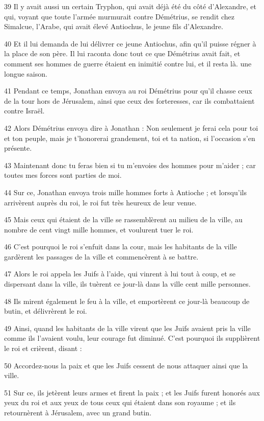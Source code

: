 \par 39 Il y avait aussi un certain Tryphon, qui avait déjà été du côté d'Alexandre, et qui, voyant que toute l'armée murmurait contre Démétrius, se rendit chez Simalcue, l'Arabe, qui avait élevé Antiochus, le jeune fils d'Alexandre.
\par 40 Et il lui demanda de lui délivrer ce jeune Antiochus, afin qu'il puisse régner à la place de son père. Il lui raconta donc tout ce que Démétrius avait fait, et comment ses hommes de guerre étaient en inimitié contre lui, et il resta là. une longue saison.
\par 41 Pendant ce temps, Jonathan envoya au roi Démétrius pour qu'il chasse ceux de la tour hors de Jérusalem, ainsi que ceux des forteresses, car ils combattaient contre Israël.
\par 42 Alors Démétrius envoya dire à Jonathan : Non seulement je ferai cela pour toi et ton peuple, mais je t'honorerai grandement, toi et ta nation, si l'occasion s'en présente.
\par 43 Maintenant donc tu feras bien si tu m'envoies des hommes pour m'aider ; car toutes mes forces sont parties de moi.
\par 44 Sur ce, Jonathan envoya trois mille hommes forts à Antioche ; et lorsqu'ils arrivèrent auprès du roi, le roi fut très heureux de leur venue.
\par 45 Mais ceux qui étaient de la ville se rassemblèrent au milieu de la ville, au nombre de cent vingt mille hommes, et voulurent tuer le roi.
\par 46 C'est pourquoi le roi s'enfuit dans la cour, mais les habitants de la ville gardèrent les passages de la ville et commencèrent à se battre.
\par 47 Alors le roi appela les Juifs à l'aide, qui vinrent à lui tout à coup, et se dispersant dans la ville, ils tuèrent ce jour-là dans la ville cent mille personnes.
\par 48 Ils mirent également le feu à la ville, et emportèrent ce jour-là beaucoup de butin, et délivrèrent le roi.
\par 49 Ainsi, quand les habitants de la ville virent que les Juifs avaient pris la ville comme ils l'avaient voulu, leur courage fut diminué. C'est pourquoi ils supplièrent le roi et crièrent, disant :
\par 50 Accordez-nous la paix et que les Juifs cessent de nous attaquer ainsi que la ville.
\par 51 Sur ce, ils jetèrent leurs armes et firent la paix ; et les Juifs furent honorés aux yeux du roi et aux yeux de tous ceux qui étaient dans son royaume ; et ils retournèrent à Jérusalem, avec un grand butin.
